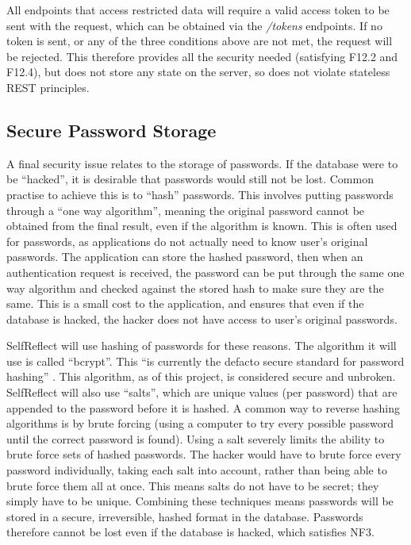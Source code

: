 \documentclass[11pt,openright,a4paper]{report}
\begin{document}
All endpoints that access restricted data will require a valid access token to be sent with the request, which can be obtained via the \emph{/tokens} endpoints. If no token is sent, or any of the three conditions above are not met, the request will be rejected. This therefore provides all the security needed (satisfying F12.2 and F12.4), but does not store any state on the server, so does not violate stateless REST principles.

\subsection{Secure Password Storage} \label{subsec:secpass}
A final security issue relates to the storage of passwords. If the database were to be \enquote{hacked}, it is desirable that passwords would still not be lost. Common practise to achieve this is to \enquote{hash} passwords. This involves putting passwords through a \enquote{one way algorithm}, meaning the original password cannot be obtained from the final result, even if the algorithm is known. This is often used for passwords, as applications do not actually need to know user's original passwords. The application can store the hashed password, then when an authentication request is received, the password can be put through the same one way algorithm and checked against the stored hash to make sure they are the same. This is a small cost to the application, and ensures that even if the database is hacked, the hacker does not have access to user's original passwords.

SelfReflect will use hashing of passwords for these reasons. The algorithm it will use is called \enquote{bcrypt}. This \enquote{is currently the defacto secure standard for password hashing} \parencite{bcryptblog}. This algorithm, as of this project, is considered secure and unbroken. SelfReflect will also use \enquote{salts}, which are unique values (per password) that are appended to the password before it is hashed. A common way to reverse hashing algorithms is by brute forcing (using a computer to try every possible password until the correct password is found). Using a salt severely limits the ability to brute force sets of hashed passwords. The hacker would have to brute force every password individually, taking each salt into account, rather than being able to brute force them all at once. This means salts do not have to be secret; they simply have to be unique. Combining these techniques means passwords will be stored in a secure, irreversible, hashed format in the database. Passwords therefore cannot be lost even if the database is hacked, which satisfies NF3.
\end{document}
